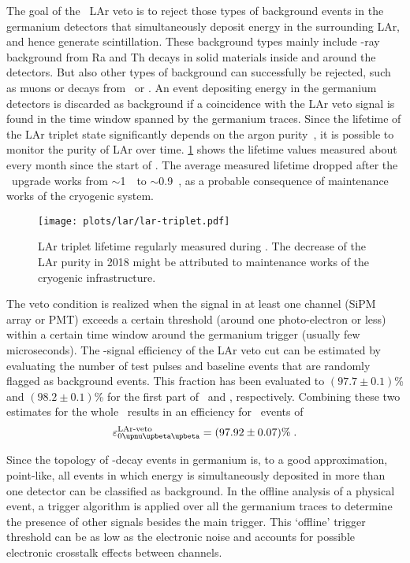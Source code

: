 \newpar
The goal of the \gerda\ LAr veto is to reject those types of background events in the
germanium detectors that simultaneously deposit energy in the surrounding LAr, and hence
generate scintillation. These background types mainly include \g-ray background from Ra
and Th decays in solid materials inside and around the detectors. But also other types of
background can successfully be rejected, such as muons or decays from \Arh\ or \kvz. An
event depositing energy in the germanium detectors is discarded as background if a
coincidence with the LAr veto signal is found in the time window spanned by the germanium
traces.  Since the lifetime of the LAr triplet state significantly depends on the argon
purity~\cite{Amsler2007}, it is possible to monitor the purity of LAr over time.
\cref{fig:lar:triplet-lifetime} shows the lifetime values measured about every month since
the start of \phasetwo. The average measured lifetime dropped after the \phasetwop\
upgrade works from $\sim$1~\mus\ to $\sim$0.9~\mus, as a probable consequence of
maintenance works of the cryogenic system.
\begin{figure}
  \centering
  \texttt{[image: plots/lar/lar-triplet.pdf]}
  \caption{%
    LAr triplet lifetime regularly measured during \phasetwo. The decrease of the LAr
    purity in 2018 might be attributed to maintenance works of the cryogenic
    infrastructure.
  }\label{fig:lar:triplet-lifetime}
\end{figure}
The veto condition is realized when the signal in at least one channel (SiPM array or PMT)
exceeds a certain threshold (around one photo-electron or less) within a certain time
window around the germanium trigger (usually few microseconds). The \onbb-signal
efficiency of the LAr veto cut can be estimated by evaluating the number of test pulses
and baseline events that are randomly flagged as background events. This fraction has been
evaluated to $(97.7 \pm 0.1)$\% and $(98.2 \pm 0.1)$\% for the first part of \phasetwo\
and \phasetwop, respectively. Combining these two estimates for the whole \phasetwo\
results in an efficiency for \onbb\ events of
\[
  \epsilon_\onbbM^\text{LAr-veto} = (97.92 \pm 0.07)\% \;.
\]

Since the topology of \onbb-decay events in germanium is, to a good approximation,
point-like, all events in which energy is simultaneously deposited in more than one
detector can be classified as background. In the offline analysis of a physical event, a
trigger algorithm is applied over all the germanium traces to determine the presence of
other signals besides the main trigger. This `offline' trigger threshold can be as low as
the electronic noise and accounts for possible electronic crosstalk effects between
channels.

